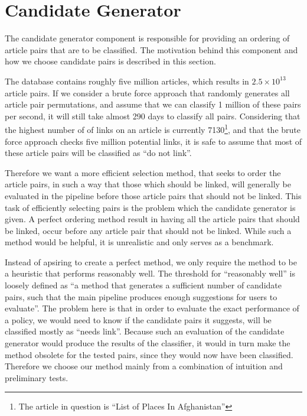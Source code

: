 \section{Candidate Generator}
The candidate generator component is responsible for providing an ordering of article pairs that are to be classified. The motivation behind this component and how we choose candidate pairs is described in this section.


The database contains roughly five million articles, which results in $2.5 \times 10^{13}$ article pairs. If we consider a brute force approach that randomly generates all article pair permutations, and assume that we can classify 1 million of these pairs per second, it will still take almost 290 days to classify all pairs. Considering that the highest number of of links on an article is currently 7130\footnote{The article in question is \enquote{List of Places In Afghanistan}}, and that the brute force approach checks five million potential links, it is safe to assume that most of these article pairs will be classified as \enquote{do not link}.

Therefore we want a more efficient selection method, that seeks to order the article pairs, in such a way that those which should be linked, will generally be evaluated in the pipeline before those article pairs that should not be linked. This task of efficiently selecting pairs is the problem which the candidate generator is given. A perfect ordering method result in having all the article pairs that should be linked, occur before any article pair that should not be linked. While such a method would be helpful, it is unrealistic and only serves as a benchmark. 

Instead of apsiring to create a perfect method, we only require the method to be a heuristic that performs reasonably well. The threshold for \enquote{reasonably well} is loosely defined as \enquote{a method that generates a sufficient number of candidate pairs, such that the main pipeline produces enough suggestions for users to evaluate}. The problem here is that in order to evaluate the exact performance of a policy, we would need to know if the candidate pairs it suggests, will be classified mostly as \enquote{needs link}. Because such an evaluation of the candidate generator would produce the results of the classifier, it would in turn make the method obsolete for the tested pairs, since they would now have been classified. Therefore we choose our method mainly from a combination of intuition and preliminary tests.

